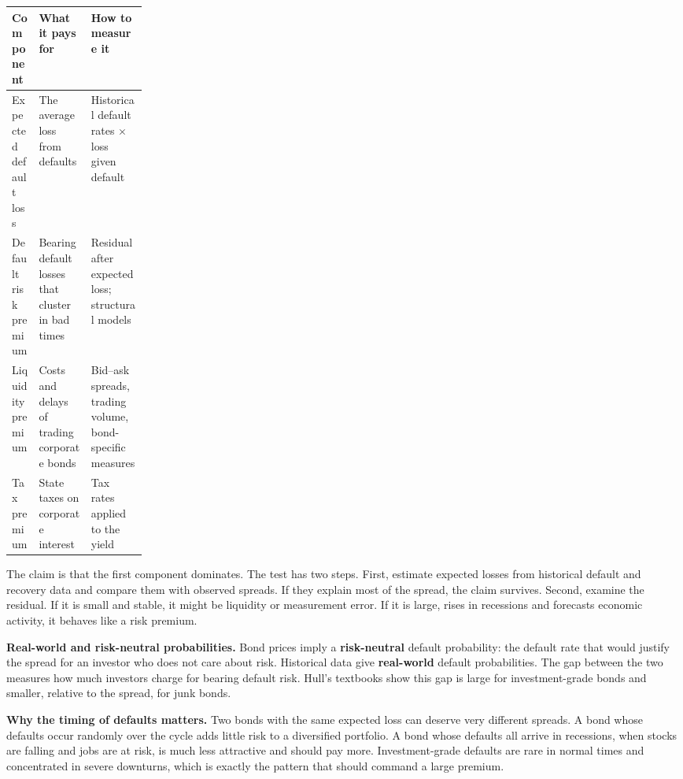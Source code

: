 \begin{center}
\small
\begin{tabularx}{0.9\linewidth}{@{}>{\raggedright\arraybackslash}p{0.2\linewidth}>{\raggedright\arraybackslash}X>{\raggedright\arraybackslash}X@{}}
\toprule
Component & What it pays for & How to measure it \\
\midrule
Expected default loss & The average loss from defaults & Historical default rates $\times$ loss given default \\
Default risk premium & Bearing default losses that cluster in bad times & Residual after expected loss; structural models \\
Liquidity premium & Costs and delays of trading corporate bonds & Bid--ask spreads, trading volume, bond-specific measures \\
Tax premium & State taxes on corporate interest & Tax rates applied to the yield \\
\bottomrule
\end{tabularx}
\end{center}

The claim is that the first component dominates. The test has two steps. First, estimate expected losses from historical default and recovery data and compare them with observed spreads. If they explain most of the spread, the claim survives. Second, examine the residual. If it is small and stable, it might be liquidity or measurement error. If it is large, rises in recessions and forecasts economic activity, it behaves like a risk premium.

\textbf{Real-world and risk-neutral probabilities.} Bond prices imply a \textbf{risk-neutral} default probability: the default rate that would justify the spread for an investor who does not care about risk. Historical data give \textbf{real-world} default probabilities. The gap between the two measures how much investors charge for bearing default risk. Hull's textbooks show this gap is large for investment-grade bonds and smaller, relative to the spread, for junk bonds.

\textbf{Why the timing of defaults matters.} Two bonds with the same expected loss can deserve very different spreads. A bond whose defaults occur randomly over the cycle adds little risk to a diversified portfolio. A bond whose defaults all arrive in recessions, when stocks are falling and jobs are at risk, is much less attractive and should pay more. Investment-grade defaults are rare in normal times and concentrated in severe downturns, which is exactly the pattern that should command a large premium.

